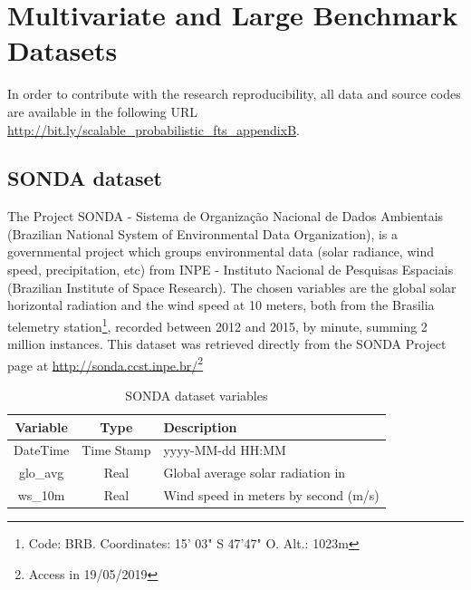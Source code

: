 \chapter{Multivariate and Large Benchmark Datasets}
\label{apd:multivariate_datasets}

In order to contribute with the research reproducibility, all data and source codes are available in the following URL \url{http://bit.ly/scalable_probabilistic_fts_appendixB}.


\section{SONDA dataset}

The Project SONDA - Sistema de Organização Nacional de Dados Ambientais (Brazilian National System of Environmental Data Organization), is a governmental project which groups environmental data (solar radiance, wind speed, precipitation, etc) from INPE - Instituto Nacional de Pesquisas Espaciais (Brazilian Institute of Space Research). The chosen variables are the global solar horizontal radiation and the wind speed at 10 meters, both from the Brasilia telemetry station\footnote{Code: BRB. Coordinates: 15' 03" S 47'47" O. Alt.: 1023m}, recorded between 2012 and 2015, by minute, summing 2 million instances. This dataset was retrieved directly from the SONDA Project page at \url{http://sonda.ccst.inpe.br/}\footnote{Access in 19/05/2019}

\begin{table}[htb]
    \centering
    \begin{tabular}{|c|c|l|} \hline
        \textbf{Variable} & \textbf{Type} & \textbf{Description}  \\ \hline
        DateTime & Time Stamp & yyyy-MM-dd HH:MM  \\ \hline
        glo\_avg & Real & Global average solar radiation in   \\ \hline
        ws\_10m & Real & Wind speed in meters by second (m/s)  \\ \hline
    \end{tabular}
    \caption{SONDA dataset variables}
    \label{tab:sonda_variables}
\end{table}

